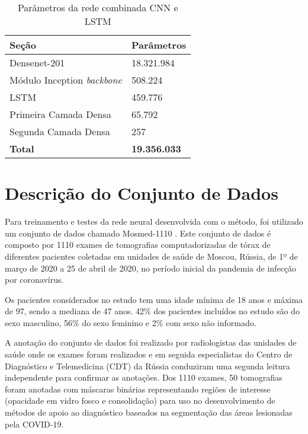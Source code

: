 \begin{table}[]
\centering
\caption{Parâmetros da rede combinada CNN e LSTM}
\label{table:met_pesos_rede_completa_lstm}
\begin{tabular}{@{}ll@{}}
\toprule
Seção                                               & Parâmetros          \\ \midrule
Densenet-201                                        & 18.321.984          \\
Módulo Inception \textit{backbone}                  & 508.224             \\
LSTM                                                & 459.776             \\
Primeira Camada Densa                               & 65.792              \\
Segunda Camada Densa                                & 257                 \\
\textbf{Total}                                      & \textbf{19.356.033} \\ \bottomrule
\end{tabular}
\end{table}



\section{Descrição do Conjunto de Dados}\label{sec:cap_metodo_descricao_dataset}

Para treinamento e testes da rede neural desenvolvida com o método, foi utilizado um conjunto de dados chamado Mosmed-1110 \cite{morozov2020mosmeddata}. Este conjunto de dados é composto por 1110 exames de tomografias computadorizadas de tórax de diferentes pacientes coletadas em unidades de saúde de Moscou, Rússia, de 1º de março de 2020 a 25 de abril de 2020, no período inicial da pandemia de infecção por coronavírus. 

Os pacientes considerados no estudo tem uma idade mínima de 18 anos e máxima de 97, sendo a mediana de 47 anos. 42\% dos pacientes incluídos no estudo são do sexo masculino, 56\% do sexo feminino e 2\% com sexo não informado.

A anotação do conjunto de dados foi realizado por radiologistas das unidades de saúde onde os exames foram realizados e em seguida especialistas do Centro de Diagnóstico e Telemedicina (CDT) da Rússia conduziram uma segunda leitura independente para confirmar as anotações. Dos 1110 exames, 50 tomografias foram anotadas com máscaras binárias representando regiões de interesse (opacidade em vidro fosco e consolidação) para uso no desenvolvimento de métodos de apoio ao diagnóstico baseados na segmentação das áreas lesionadas pela COVID-19.


